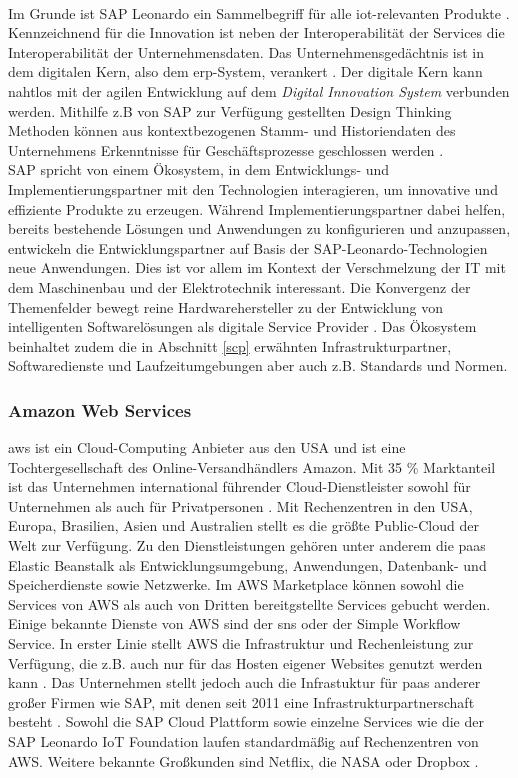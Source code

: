 \\Im Grunde ist SAP Leonardo ein Sammelbegriff für alle \ac{iot}-relevanten Produkte \citep{Utecht2018}. Kennzeichnend für die Innovation ist neben der Interoperabilität der Services die Interoperabilität der Unternehmensdaten. Das Unternehmensgedächtnis ist in dem digitalen Kern, also dem \ac{erp}-System, verankert \citep{Elsner2018}. Der digitale Kern kann nahtlos mit der agilen Entwicklung auf dem \textit{Digital Innovation System} verbunden werden. Mithilfe  z.B von SAP zur Verfügung gestellten Design Thinking Methoden können aus kontextbezogenen Stamm- und Historiendaten des Unternehmens Erkenntnisse für Geschäftsprozesse geschlossen werden \citep{Elsner2018}.
\\SAP spricht von einem Ökosystem, in dem Entwicklungs- und Implementierungspartner mit den Technologien interagieren, um innovative und effiziente Produkte zu erzeugen. Während Implementierungspartner dabei helfen, bereits bestehende Lösungen und Anwendungen zu konfigurieren und anzupassen, entwickeln die Entwicklungspartner auf Basis der SAP-Leonardo-Technologien neue Anwendungen. Dies ist vor allem im Kontext der Verschmelzung der IT mit dem Maschinenbau und der Elektrotechnik interessant. Die Konvergenz der Themenfelder bewegt reine Hardwarehersteller zu der Entwicklung von intelligenten Softwarelösungen als digitale Service Provider \citep{Elsner2018}. Das Ökosystem beinhaltet zudem die in Abschnitt \ref{scp} erwähnten Infrastrukturpartner, Softwaredienste und Laufzeitumgebungen aber auch z.B. Standards und Normen.


\subsubsection{Amazon Web Services}

\acf{aws} ist ein Cloud-Computing Anbieter aus den USA und ist eine Tochtergesellschaft des Online-Versandhändlers Amazon. Mit 35 \% Marktanteil ist das Unternehmen international führender Cloud-Dienstleister sowohl für Unternehmen als auch für Privatpersonen \citep{awsms2019}. Mit Rechenzentren in den USA, Europa, Brasilien, Asien und Australien stellt es die größte Public-Cloud der Welt zur Verfügung. Zu den Dienstleistungen gehören unter anderem die \ac{paas} Elastic Beanstalk als Entwicklungsumgebung, Anwendungen, Datenbank- und Speicherdienste sowie Netzwerke. Im AWS Marketplace können sowohl die Services von AWS als auch von Dritten bereitgstellte Services gebucht werden. Einige bekannte Dienste von AWS sind der \acf{sns} oder der Simple Workflow Service. In erster Linie stellt AWS die Infrastruktur und Rechenleistung zur Verfügung, die z.B. auch nur für das Hosten eigener Websites genutzt werden kann \citep{AWS}. Das Unternehmen stellt jedoch auch die Infrastuktur für \ac{paas} anderer großer Firmen wie SAP, mit denen seit 2011 eine Infrastrukturpartnerschaft besteht \citep{Elsner2018}. Sowohl die SAP Cloud Plattform sowie einzelne Services wie die der SAP Leonardo IoT Foundation laufen standardmäßig auf Rechenzentren von AWS. Weitere bekannte Großkunden sind Netflix, die NASA oder Dropbox \citep{awsms2019}.



\newpage
